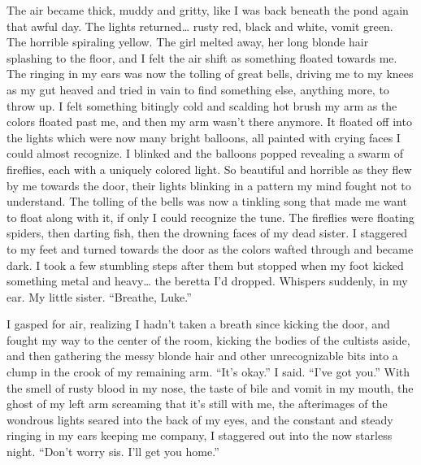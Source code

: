 The air became thick, muddy and gritty, like I was back beneath the
pond again that awful day. The lights returned{\ldots} rusty red,
black and white, vomit green. The horrible spiraling yellow. The
girl melted away, her long blonde hair splashing to the floor, and
I felt the air shift as something floated towards me. The ringing
in my ears was now the tolling of great bells, driving me to my
knees as my gut heaved and tried in vain to find something else,
anything more, to throw up. I felt something bitingly cold and
scalding hot brush my arm as the colors floated past me, and then
my arm wasn't there anymore. It floated off into the lights
which were now many bright balloons, all painted with crying faces
I could almost recognize. I blinked and the balloons popped
revealing a swarm of fireflies, each with a uniquely colored light.
So beautiful and horrible as they flew by me towards the door,
their lights blinking in a pattern my mind fought not to
understand. The tolling of the bells was now a tinkling song that
made me want to float along with it, if only I could recognize the
tune. The fireflies were floating spiders, then darting fish, then
the drowning faces of my dead sister. I staggered to my feet and
turned towards the door as the colors wafted through and became
dark. I took a few stumbling steps after them but stopped when my
foot kicked something metal and heavy{\ldots} the beretta I'd
dropped. Whispers suddenly, in my ear. My little sister.
``Breathe, Luke.''



I gasped for air, realizing I hadn't taken a breath since
kicking the door, and fought my way to the center of the room,
kicking the bodies of the cultists aside, and then gathering the
messy blonde hair and other unrecognizable bits into a clump in the
crook of my remaining arm. ``It's okay.'' I said.
``I've got you.'' With the smell of rusty blood in
my nose, the taste of bile and vomit in my mouth, the ghost of my
left arm screaming that it's still with me, the afterimages
of the wondrous lights seared into the back of my eyes, and the
constant and steady ringing in my ears keeping me company, I
staggered out into the now starless night. ``Don't worry
sis. I'll get you home.'' 
 



